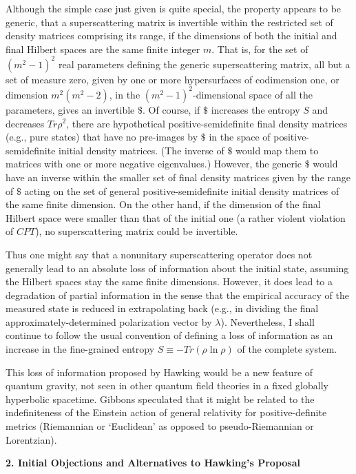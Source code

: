      Although the simple case just given is quite special, the
property appears
to be generic, that a superscattering matrix is invertible within the
restricted set
of density matrices comprising its range, if the dimensions of both
the initial
and final Hilbert spaces are the same finite integer $m$.  That is,
for the set
of $(m^2-1)^2$ real parameters defining the generic superscattering
matrix,
all but a set of measure zero, given by one or more hypersurfaces of
codimension one, or dimension $m^2(m^2-2)$, in the
$(m^2-1)^2$-dimensional
space of all the parameters, gives an invertible $\$$.  Of course, if
$\$$
increases the entropy $S$ and decreases $Tr\rho^2$, there are
hypothetical
positive-semidefinite final density matrices (e.g., pure states) that
have no
pre-images by $\$$ in the space of positive-semidefinite initial
density
matrices.
(The inverse of $\$$ would map them to matrices with one or more
negative
eigenvalues.)  However, the generic $\$$ would have an inverse within
the
smaller set of final density matrices given by the range of $\$$
acting on the
set of general positive-semidefinite initial density matrices of the
same
finite
dimension.  On the other hand, if the dimension of the final Hilbert
space
were smaller than that of the initial one (a rather violent violation
of
$CPT$),
no superscattering matrix could be invertible.

     Thus
one might say that a nonunitary superscattering operator does not
generally
lead to an absolute loss of information about the initial state,
assuming
the Hilbert spaces stay the same finite dimensions. However, it does
lead to a degradation of partial information in the sense that the
empirical
accuracy of the measured state is reduced in extrapolating back
(e.g., in
dividing the final approximately-determined polarization vector by
$\lambda$).
Nevertheless, I shall continue to follow the usual convention of
defining a
loss of information as an increase in the fine-grained entropy
$S\equiv-Tr(\rho\ln\rho)$ of the complete system.

     This loss of information proposed by Hawking would be a new
feature
of quantum gravity, not seen in other quantum field theories in a
fixed
globally hyperbolic spacetime.  Gibbons \cite{Gib77} speculated that
it might be related to the indefiniteness of the Einstein action of
general
relativity for positive-definite metrics (Riemannian or `Euclidean'
as
opposed to pseudo-Riemannian or Lorentzian).

\vspace{5 mm}
{\bf 2.  Initial Objections and Alternatives to Hawking's Proposal}
\vspace{5 mm}

